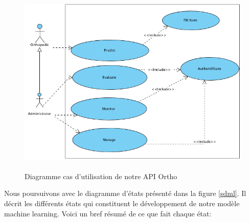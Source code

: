 \documentclass[12pt, french]{report}
\begin{document}
\begin{figure}[h]
	\includegraphics[width=17cm, height =9cm]{images/UseCaseDiag.png}
	\caption{Diagramme cas d'utilisation de notre API Ortho}
	\label{usecase}
\end{figure}  

Nous poursuivons avec le diagramme d'états présenté dans la figure \ref{sdml}.  Il décrit les différents états qui constituent le développement de notre modèle machine learning. Voici un bref résumé de ce que fait chaque état: 
\end{document}
